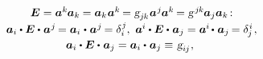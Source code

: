 \begin{otherlanguage}{russian}
\nopagebreak\vspace{-0.1em}\begin{equation}\begin{array}{c}
\UnitDyad = \bm{a}^{k} \hspace{-0.1ex} \bm{a}_{k} \hspace{-0.1ex} = \bm{a}_{k} \hspace{.1ex} \bm{a}^{k} \hspace{-0.2ex} = \textsl{g}_{j\hspace{-0.1ex}k} \hspace{.1ex} \bm{a}^{\hspace{.1ex}j} \hspace{-0.1ex} \bm{a}^{k} \hspace{-0.2ex} = \textsl{g}^{\hspace{0.25ex}j\hspace{-0.1ex}k} \hspace{-0.1ex} \bm{a}_j \bm{a}_k \hspace{-0.32ex}: \\[0.2em]
%
\bm{a}_i \dotp \UnitDyad \dotp \hspace{.1ex} \bm{a}^{\hspace{.1ex}j} \hspace{-0.2ex} = \bm{a}_i \hspace{.1ex} \dotp \hspace{.1ex} \bm{a}^{\hspace{.1ex}j} \hspace{-0.2ex} = \delta_i^{\hspace{.1ex}j} , \hspace{0.32em}
\bm{a}^{\hspace{-0.05ex}i} \dotp \UnitDyad \dotp \hspace{.1ex} \bm{a}_j = \bm{a}^{\hspace{-0.05ex}i} \hspace{-0.2ex} \dotp \hspace{.1ex} \bm{a}_j \hspace{-0.2ex} = \delta_{\hspace{-0.1ex}j}^{\hspace{.1ex}i} \hspace{0.2ex},
\\[0.2em]
%
\bm{a}_i \dotp \UnitDyad \dotp \hspace{.1ex} \bm{a}_j = \bm{a}_i \dotp \hspace{.1ex} \bm{a}_j \equiv \hspace{.16ex} \textsl{g}_{i\hspace{-0.1ex}j} \hspace{.1ex} , \hspace{0.32em}

\end{array}
\end{equation}
\end{otherlanguage}
